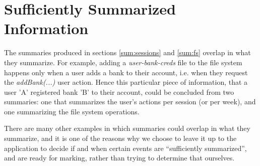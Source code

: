 \section{Sufficiently Summarized Information}

The summaries produced in sections \ref{sum:sessions} and \ref{sum:fs} overlap in what they summarize. For example, adding a \emph{user-bank-creds} file to the file system happens only when a user adds a bank to their account, i.e. when they request the \emph{addBank(...)} user action. Hence this particular piece of information, that a user 'A' registered bank 'B' to their account, could be concluded from two summaries: one that summarizes the user's actions per session (or per week), and one summarizing the file system operations.

There are many other examples in which summaries could overlap in what they summarize, and it is one of the reasons why we choose to leave it up to the application to decide if and when certain events are ``sufficiently summarized'', and are ready for marking, rather than trying to determine that ourselves.

